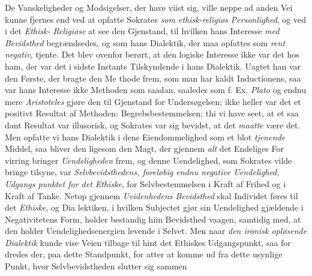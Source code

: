 De Vanskeligheder og Modsigelser, der have viist sig, ville
neppe ad anden Vei kunne fjernes end ved at opfatte Sokrates
\emph{som ethisk-religiøs Personlighed}, og ved i det \emph{Ethisk-%
Religiøse} at see den Gjenstand, til hvilken hans Interesse
\emph{med Bevidsthed} begrændsedes, og som hans Dialektik,
der maa opfattes som \emph{rent negativ}, tjente.
Det blev ovenfor berørt, at den logiske Interesse ikke var
det hos ham, der var det i sidste Instants Tilskyndende i hans
Dialektik. Uagtet han var den Første, der bragte den Me\-%
thode frem, som man har kaldt Inductionens, saa var hans
Interesse ikke Methoden som saadan, saaledes som f. Ex.
\emph{Plato} og endnu mere \emph{Aristoteles} gjøre den til Gjenstand
for Undersøgelsen; ikke heller var det et positivt Resultat af
Methoden: Begrebsbestemmelsen; thi vi have seet, at et saa\-%
dant Resultat var illusorisk, og Sokrates var sig bevidst, at
det \emph{maatte} være det. Men opfatte vi hans Dialektik i dens
Eiendommelighed som et blot \emph{tjenende} Middel, saa bliver
den ligesom den Magt, der gjennem \emph{alt} det Endeliges For\-%
virring bringer \emph{Uendeligheden} frem, og denne Uendelighed,
som Sokrates vilde bringe tilsyne, var \emph{Selvbevidsthedens,
foreløbig endnu negative Uendelighed, Udgangs\-%
punktet for det Ethiske}, for Selvbestemmelsen i Kraft af
Frihed og i Kraft af Tanke. Netop gjennem \emph{Uvidenhedens
Bevidsthed} skal Individet føres til det \emph{Ethiske}, og Dia\-%
lektiken, i hvilken Subjectet gjør sin Uendelighed gjældende i
Negativitetens Form, holder bestandig hiin Bevidsthed vaagen,
samtidig med, at den holder Uendelighedsenergien levende i
Selvet. Men naar \emph{den ironisk opløsende Dialektik} kunde
vise Veien tilbage til hint det Ethiskes Udgangspunkt, saa for\-%
dredes der, paa dette Standpunkt, for atter at komme ud fra
dette usynlige Punkt, hvor Selvbevidstheden slutter sig sammen
